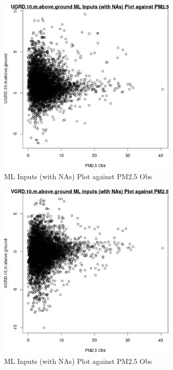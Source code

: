 \clearpage 

\begin{figure} 
\centering  
\includegraphics[width=0.77\textwidth]{Code_Outputs/Report_ML_input_PM25_Step4_part_e_de_duplicated_aveswNAs_UGRD10mabovegroundvPM25_Obs.jpg} 
\caption{\label{fig:Report_ML_input_PM25_Step4_part_e_de_duplicated_aveswNAsUGRD10mabovegroundvPM25_Obs}ML Inputs (with NAs) Plot against PM2.5 Obs} 
\end{figure} 
 

\begin{figure} 
\centering  
\includegraphics[width=0.77\textwidth]{Code_Outputs/Report_ML_input_PM25_Step4_part_e_de_duplicated_aveswNAs_VGRD10mabovegroundvPM25_Obs.jpg} 
\caption{\label{fig:Report_ML_input_PM25_Step4_part_e_de_duplicated_aveswNAsVGRD10mabovegroundvPM25_Obs}ML Inputs (with NAs) Plot against PM2.5 Obs} 
\end{figure} 
 

